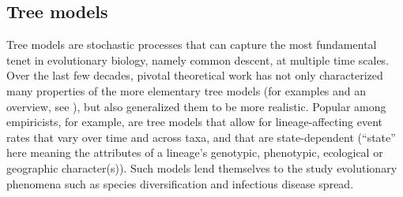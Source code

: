 \documentclass[oneside]{article}
\begin{document}



\subsection*{Tree models}

Tree models are stochastic processes that can capture the most fundamental tenet in evolutionary biology, namely common descent, at multiple time scales.
Over the last few decades, pivotal theoretical work has not only characterized many properties of the more elementary tree models (for examples and an overview, see \citealp{nee06,wakeley09,stadler13b,harmon18}), but also generalized them to be more realistic.
Popular among empiricists, for example, are tree models that allow for lineage-affecting event rates that vary over time and across taxa, and that are state-dependent (``state'' here meaning the attributes of a lineage's genotypic, phenotypic, ecological or geographic character(s)).
Such models lend themselves to the study evolutionary phenomena such as species diversification and infectious disease spread.
\end{document}
